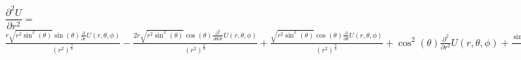 \documentclass{report}
\begin{document}
$\dfrac{\partial^2 U}{\partial r^2} =$
\\
$
\frac{r \sqrt{r^{2} \sin^{2}{\left(\theta \right)}} \sin{\left(\theta \right)} \frac{\partial}{\partial r} U{\left(r,\theta,\phi \right)}}{\left(r^{2}\right)^{\frac{3}{2}}} - \frac{2 r \sqrt{r^{2} \sin^{2}{\left(\theta \right)}} \cos{\left(\theta \right)} \frac{\partial^{2}}{\partial \theta\partial r} U{\left(r,\theta,\phi \right)}}{\left(r^{2}\right)^{\frac{3}{2}}} + \frac{\sqrt{r^{2} \sin^{2}{\left(\theta \right)}} \cos{\left(\theta \right)} \frac{\partial}{\partial \theta} U{\left(r,\theta,\phi \right)}}{\left(r^{2}\right)^{\frac{3}{2}}} + \cos^{2}{\left(\theta \right)} \frac{\partial^{2}}{\partial r^{2}} U{\left(r,\theta,\phi \right)} + \frac{\sin^{2}{\left(\theta \right)} \frac{\partial^{2}}{\partial \theta^{2}} U{\left(r,\theta,\phi \right)}}{r^{2}} + \frac{\sin{\left(2 \theta \right)} \frac{\partial}{\partial \theta} U{\left(r,\theta,\phi \right)}}{2 r^{2}}
$
\end{document}
